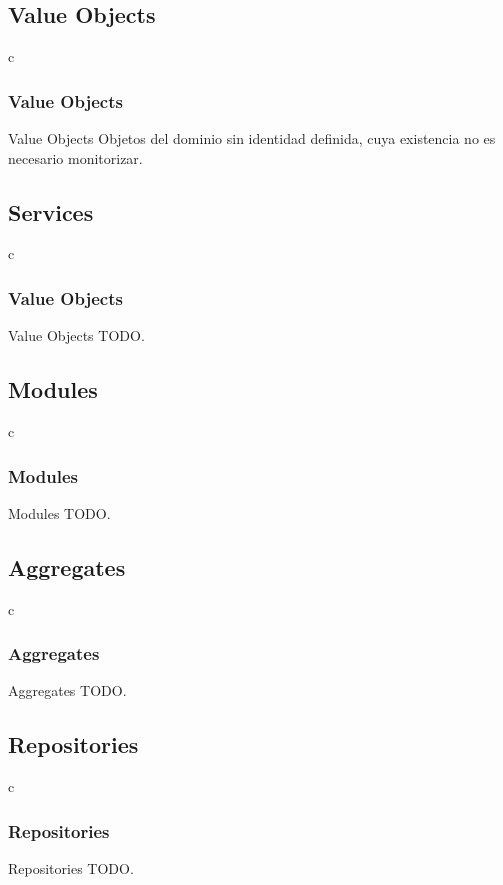\documentclass[a4paper,slidestop,xcolor=pst,dvips,blue]{beamer}
\begin{document}
\subsection{Value Objects}

\begin{frame}{c}
    \frametitle{Value Objects}
    \begin{block}{Value Objects}
    Objetos del dominio sin identidad definida, cuya existencia no es necesario monitorizar.
    \end{block}
\end{frame}

\subsection{Services}

\begin{frame}{c}
    \frametitle{Value Objects}
    \begin{block}{Value Objects}
    TODO.
    \end{block}
\end{frame}

\subsection{Modules}

\begin{frame}{c}
    \frametitle{Modules}
    \begin{block}{Modules}
    TODO.
    \end{block}
\end{frame}

\subsection{Aggregates}

\begin{frame}{c}
    \frametitle{Aggregates}
    \begin{block}{Aggregates}
    TODO.
    \end{block}
\end{frame}

\subsection{Repositories}

\begin{frame}{c}
    \frametitle{Repositories}
    \begin{block}{Repositories}
    TODO.
    \end{block}
\end{frame}
\end{document}
